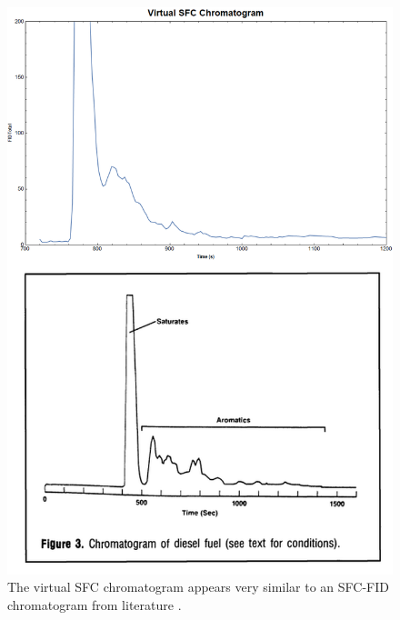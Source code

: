 \begin{figure}
	\centering
	\includegraphics[width=\textwidth]{Figures/VirtualSFC_Compared.png}
	\decoRule	
	
\caption[Comparing SFC-FID and virtual SFC.]{The virtual SFC chromatogram
appears very similar to an SFC-FID chromatogram from literature
\autocite{DiSanzo1991}.}
	
	\label{fig:Virtual_SFC} 
\end{figure}


% 	
% 


